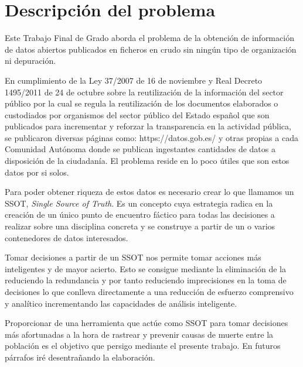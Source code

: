 \chapter{Descripción del problema}

Este Trabajo Final de Grado aborda el problema de la obtención de información de datos 
abiertos publicados en ficheros en crudo sin ningún tipo de organización ni depuración.

En cumplimiento de la Ley 37/2007 de 16 de noviembre y Real Decreto 1495/2011 de 24 de 
octubre sobre la reutilización de la información del sector público por la cual se regula 
la reutilización de los documentos elaborados o custodiados por organismos del sector 
público del Estado español que son publicados para incrementar y reforzar la 
transparencia en la actividad pública, se publicaron diversas páginas como: https://datos.gob.es/ 
y otras propias a cada Comunidad Autónoma donde se publican ingestantes cantidades de 
datos a disposición de la ciudadanía. El problema reside en lo poco útiles que son
estos datos por si solos. 

Para poder obtener riqueza de estos datos es necesario crear lo que 
llamamos un SSOT, \textit{Single Source of Truth}. Es un concepto cuya estrategia radica 
en la creación de un único punto de encuentro fáctico para todas las decisiones a 
realizar sobre una disciplina concreta y se construye a partir de un o varios contenedores 
de datos interesados.

Tomar decisiones a partir de un SSOT nos permite tomar acciones más inteligentes 
y de mayor acierto. Esto se consigue mediante la eliminación de la reduciendo la 
redundancia y por tanto reduciendo imprecisiones en la toma de decisiones lo que 
conlleva directamente a una reducción de esfuerzo comprensivo y analítico incrementando 
las capacidades de análisis inteligente. 

Proporcionar de una herramienta que actúe como SSOT para tomar decisiones
más afortunadas a la hora de rastrear y prevenir causas de muerte entre la 
población es el objetivo que persigo mediante el presente trabajo. En futuros párrafos iré
desentrañando la elaboración.
